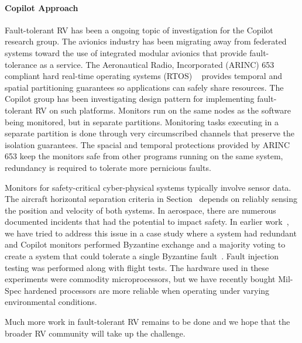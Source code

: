 \paragraph{Copilot Approach} Fault-tolerant RV has been a ongoing topic of
 investigation for the Copilot research group. The avionics industry
 has been migrating away from federated systems toward the use of
 integrated modular avionics that provide fault-tolerance as a
 service.  The Aeronautical Radio, Incorporated (ARINC)
 653~\cite{ARINC653} compliant hard real-time operating systems (RTOS)
 ~\cite{Kaveh15} provides temporal and spatial partitioning guarantees
 so applications can safely share resources.  The Copilot group has
 been investigating design pattern for implementing fault-tolerant RV
 on such platforms. Monitors run on the same nodes as the software
 being monitored, but in separate partitions. Monitoring tasks
 executing in a separate partition is done through very circumscribed
 channels that preserve the isolation guarantees.  The spacial and
 temporal protections provided by ARINC 653 keep the monitors safe
 from other programs running on the same system, redundancy is
 required to tolerate more pernicious faults.


 Monitors for safety-critical cyber-physical systems typically involve
 sensor data. The aircraft horizontal separation criteria in
 Section~\cite{sec:spec} depends on reliably sensing the position and
 velocity of both systems.  In aerospace, there are numerous
 documented incidents that had the potential to impact safety.  In
 earlier work~\cite{pike-isse-13}, we have tried to address this issue
 in a case study where a system had redundant and Copilot monitors
 performed Byzantine exchange and a majority voting to create a system
 that could tolerate a single Byzantine fault~\cite{pike-isse-13}.
 Fault injection testing was performed along with flight tests.  The
 hardware used in these experiments were commodity microprocessors,
 but we have recently bought Mil-Spec hardened processors are more
 reliable when operating under varying environmental conditions.

Much more work in fault-tolerant RV remains to be done and we hope
that the broader RV community will take up the challenge.






